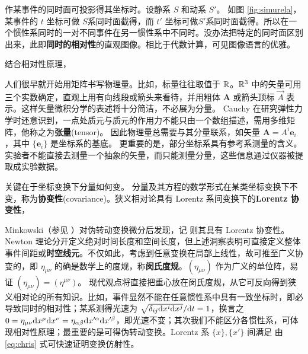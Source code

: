作某事件的同时面可投影得其坐标时。设静系 $S$ 和动系 $S'$。
如图 \ref{fig:simurela}，某事件的 $t$ 坐标可做 $S$系同时面截得，而 $t'$ 坐标可做$S'$系同时面截得。所以在一个惯性系同时的一对不同事件在另一惯性系中不同时。没办法把特定的同时面区别出来，此即\textbf{同时的相对性}的直观图像。相比于代数计算，可见图像语言的优雅。

结合相对性原理，

人们很早就开始用矩阵书写物理量。比如，标量往往取值于 $\mathbb{R}$。$\mathbb{R}^3$ 中的矢量可用三个实数确定，直观上用有向线段或箭头来看待，并用粗体 $\bm A$ 或箭头顶标 $\vec A$ 表示。这样矢量微积分学的表述将十分简洁，不必展为分量。
Cauchy 在研究弹性力学时还意识到，一点处质元与质元的作用力不能只由一个数组描述，需用多维矩阵，他称之为\textbf{张量}(tensor)。
因此物理量总需要与其分量联系，如矢量 $\bm A =A^i\bm e_i$，其中 $\{\bm e_i\}$ 是坐标系的基底。
更重要的是，部分坐标系具有参考系测量的含义。实验者不能直接去测量一个抽象的矢量，而只能测量分量，这些信息通过仪器被提取成实验数据。

关键在于坐标变换下分量如何变。
分量及其方程的数学形式在某类坐标变换下不变，称为\textbf{协变性}(covariance)。狭义相对论具有 Lorentz 系间变换下的\textbf{Lorentz 协变性}，


Minkowski（参见 \cite{PrincipleR}）对伪转动变换微分后发现，记
则其具有 Lorentz 协变性。Newton 理论分开定义绝对时间长度和空间长度，但上述洞察表明可直接定义整体事件间距或\textbf{时空线元}。不仅如此，考虑到任意变换在局部上线性，故可推至广义协变的，即 ${\eta}_{\mu\nu}$ 的确是数学上的度规，称\textbf{闵氏度规}。$(\eta_{\mu\nu})$ 作为广义的单位阵，易证 $(\eta_{\mu\nu})=(\eta^{\mu\nu})$。
现代观点将直接把重心放在闵氏度规，从它可反向得到狭义相对论的所有知识。比如，事件显然不能在任意惯性系中具有一致坐标时，即必导致同时的相对性；某系测得光速为 ${\sqrt{\delta_{ij}\dd x^i\dd x^j}}/{\dd t}=1$，换言之 $0={\eta}_{\mu\nu}\dd x^\mu\dd x^\nu={\eta}_{\alpha\beta}\dd x'^\alpha\dd x'^\beta$，即光速不变；其次我们不能区分各惯性系，可体现相对性原理；最重要的是可得伪转动变换。Lorentz 系 $\{x\},\{x'\}$ 间满足
由 \eqref{eq:chris} 式可快速证明变换仿射性。

